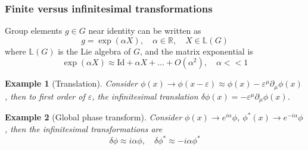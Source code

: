 \documentclass[a4paper]{article}
\newtheorem{eg}{Example}[section]
\theoremstyle{new}
\begin{document}
\subsubsection{Finite versus infinitesimal transformations}
Group elements $g\in G$ near identity can be written as
$$g=\exp(\alpha X),\quad\alpha\in\mathbb{R},\quad X\in\mathbb{L}(G)$$
where $\mathbb{L}(G)$ is the Lie algebra of $G$, and the matrix exponential is
$$\exp(\alpha X)\approx\text{Id}+\alpha X+\dots+O(\alpha^2),\quad\alpha<<1$$
\begin{eg}[Translation]
Consider $\phi(x)\rightarrow\phi(x-\varepsilon)\approx\phi(x)-\varepsilon^\mu\partial_\mu\phi(x)$, then to first order of $\varepsilon$, the infinitesimal translation  $\delta\phi(x)=-\varepsilon^\mu\partial_\mu\phi(x)$.
\end{eg}
\begin{eg}[Global phase transform]
Consider $\phi(x)\rightarrow e^{i\alpha}\phi$, $\phi^*(x)\rightarrow e^{-i\alpha}\phi$, then the infinitesimal transformations are
$$\delta\phi\approx i\alpha\phi,\quad\delta\phi^*\approx -i\alpha\phi^*$$
\end{eg}
\end{document}
